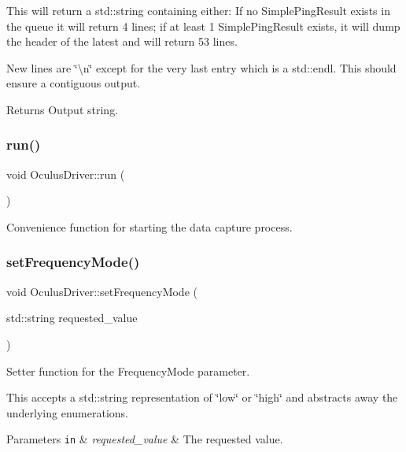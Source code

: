 This will return a std\+::string containing either\+: If no Simple\+Ping\+Result exists in the queue it will return 4 lines; if at least 1 Simple\+Ping\+Result exists, it will dump the header of the latest and will return 53 lines.

New lines are \char`\"{}\textbackslash{}n\char`\"{} except for the very last entry which is a std\+::endl. This should ensure a contiguous output.

\begin{DoxyReturn}{Returns}
Output string. 
\end{DoxyReturn}
\mbox{\label{classOculusDriver_aabb55ee02ccf7d8c42ab042532ec674c}} 
\subsubsection{\texorpdfstring{run()}{run()}}
{\footnotesize\ttfamily void Oculus\+Driver\+::run (\begin{DoxyParamCaption}{ }\end{DoxyParamCaption})}

Convenience function for starting the data capture process. \mbox{\label{classOculusDriver_ad0533517d029785c56329730082962cd}} 
\subsubsection{\texorpdfstring{set\+Frequency\+Mode()}{setFrequencyMode()}}
{\footnotesize\ttfamily void Oculus\+Driver\+::set\+Frequency\+Mode (\begin{DoxyParamCaption}\item[{std\+::string}]{requested\+\_\+value }\end{DoxyParamCaption})}

Setter function for the Frequency\+Mode parameter.

This accepts a std\+::string representation of \char`\"{}low\char`\"{} or \char`\"{}high\char`\"{} and abstracts away the underlying enumerations.


\begin{DoxyParams}[1]{Parameters}
\mbox{\tt in}  & {\em requested\+\_\+value} & The requested value. \\
\hline
\end{DoxyParams}
\mbox{\label{classOculusDriver_ad2c9b1948147a420a4669bb21ccead5f}} 
